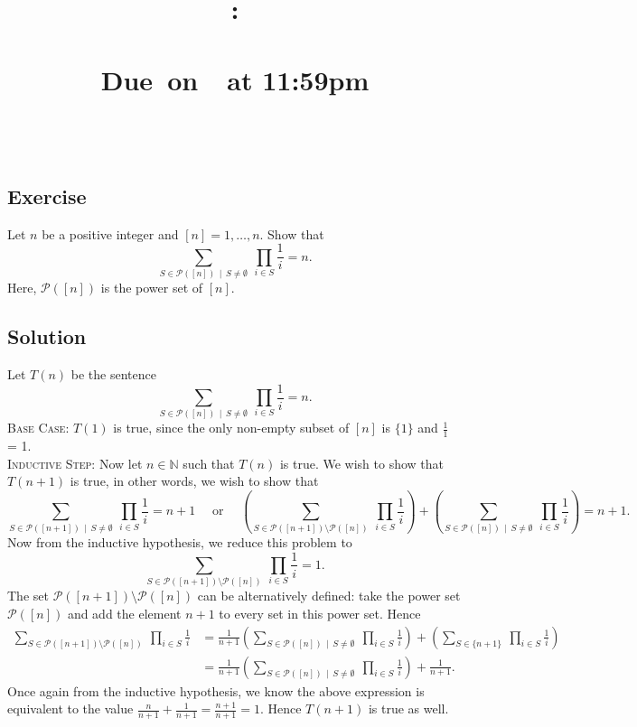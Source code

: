 \documentclass{article}
\title{
    \vspace{2in}
    \textbf{\hmwkClass:\\ \hmwkTitle} \\
    \normalsize\vspace{0.1in}\small{Due\ on\ \hmwkDueDate\ at 11:59pm} \\
    \vspace{0.1in}\large{\textit{\hmwkClassInstructor\ \hmwkSection}} \\
    \vspace{1in}
    \begin{minipage}[t]{0.5\columnwidth}
    \end{minipage}
    \vspace{1in}
    \author{\textbf{\hmwkAuthorName}}
    \date{}
}
\newcounter{counter}
\newcommand{\Exercise}{Exercise \stepcounter{counter}\thecounter}
\begin{document}
\maketitle
\pagebreak

\subsection*{\Exercise}
    Let $n$ be a positive integer and $[n] = 1, \dots, n$. Show that $$\sum_{S \in \mathcal{P}([n]) \, \mid \, S \ne \emptyset} \: \prod_{i \in S} \frac{1}{i} = n.$$ Here, $\mathcal{P}([n])$ is the power set of $[n]$.

\subsection*{Solution}
    Let $T(n)$ be the sentence $$\sum_{S \in \mathcal{P}([n]) \, \mid \, S \ne \emptyset} \: \prod_{i \in S} \frac{1}{i} = n.$$ 
    \textsc{Base Case}:  $T(1)$ is true, since the only non-empty subset of $[n]$ is $\{1\}$ and $\frac{1}{1}$ = 1. \\
    \textsc{Inductive Step}: Now let $n \in \mathbb{N}$ such that $T(n)$ is true. We wish to show that $T(n + 1)$ is true, in other words, we wish to show that $$\sum_{S \in \mathcal{P}([n + 1]) \, \mid \, S \ne \emptyset} \: \prod_{i \in S} \frac{1}{i} = n + 1 \quad\text{ or }\quad \left(\sum_{S \in \mathcal{P}([n + 1]) \setminus \mathcal{P}([n])} \: \prod_{i \in S} \frac{1}{i}\right) + \left(\sum_{S \in \mathcal{P}([n]) \, \mid \, S \ne \emptyset} \: \prod_{i \in S} \frac{1}{i}\right) = n + 1.$$ Now from the inductive hypothesis, we reduce this problem to $$\sum_{S \in \mathcal{P}([n + 1]) \setminus \mathcal{P}([n])} \: \prod_{i \in S} \frac{1}{i} = 1.$$ The set $\mathcal{P}([n + 1]) \setminus \mathcal{P}([n])$ can be alternatively defined: take the power set $\mathcal{P}([n])$ and add the element $n + 1$ to every set in this power set. Hence 
    \begin{align*}
        \sum_{S \in \mathcal{P}([n + 1]) \setminus \mathcal{P}([n])} \: \prod_{i \in S} \frac{1}{i} &= \frac{1}{n + 1}\left(\sum_{S \in \mathcal{P}([n]) \, \mid \, S \ne \emptyset} \: \prod_{i \in S} \frac{1}{i}\right) + \left(\sum_{S \in \{n + 1\}} \: \prod_{i \in S} \frac{1}{i}\right) \\
        &= \frac{1}{n + 1}\left(\sum_{S \in \mathcal{P}([n]) \, \mid \, S \ne \emptyset} \: \prod_{i \in S} \frac{1}{i}\right) + \frac{1}{n + 1}.
    \end{align*}
    Once again from the inductive hypothesis, we know the above expression is equivalent to the value $\frac{n}{n + 1} + \frac{1}{n + 1}= \frac{n + 1}{n + 1} = 1$. Hence $T(n + 1)$ is true as well.
    
\end{document}

